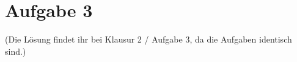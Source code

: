 \section*{Aufgabe 3}

(Die Lösung findet ihr bei Klausur 2 / Aufgabe 3, da die Aufgaben identisch sind.)
